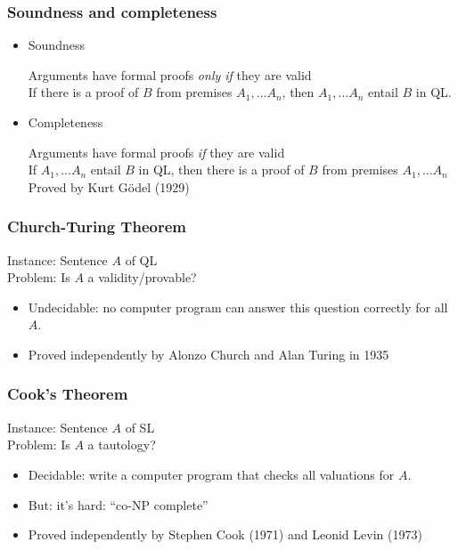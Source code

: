 \begin{frame}
    \frametitle{Soundness and completeness}

\begin{itemize}[<+->]
\item Soundness

Arguments have formal proofs \emph{only if} they are valid\\
If there is a proof of $B$ from premises $ A_1, \dots A_n$, then $
A_1, \dots A_n$ entail $B$ in QL.

\item Completeness

Arguments have formal proofs \emph{if} they are valid\\
If $ A_1, \dots A_n$ entail $B$ in QL, then there is a proof of $B$ from premises $ A_1, \dots A_n$\\[2ex]
Proved by Kurt G\"odel (1929)
\end{itemize}
\end{frame}

\begin{frame}
    \frametitle{Church-Turing Theorem}

\begin{block}{Instance: Sentence $A$ of QL\\
Problem: Is $A$ a validity/provable?}

\begin{itemize}
\item Undecidable: no computer program can answer this question correctly for all $A$.
\item Proved independently by Alonzo Church and Alan Turing in 1935
\end{itemize}
\end{block}
\end{frame}


\begin{frame}
  \frametitle{Cook's Theorem}

\begin{block}{Instance: Sentence $A$ of SL\\
Problem: Is $A$ a tautology?}

\begin{itemize}
\item Decidable: write a computer program that checks all valuations for $A$.
\item But: it's hard: ``co-NP complete''
\item Proved independently by Stephen Cook (1971) and Leonid Levin (1973)
\end{itemize}
\end{block}
\end{frame}


